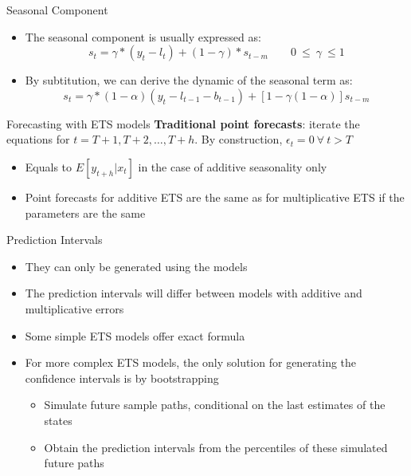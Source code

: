 \documentclass{beamer}
\begin{document}
\begin{frame}{Seasonal Component}
  \begin{itemize}
  \item The seasonal component is usually expressed as:
    \begin{equation*}
      s_t = \gamma*(y_t - l_t) + (1-\gamma)*s_{t-m} \qquad 0 \ \leq \ \gamma \ \leq 1
    \end{equation*}
  \item By subtitution, we can derive the dynamic of the seasonal term as:
    \begin{equation*}
      s_t = \gamma*(1-\alpha)(y_t - l_{t-1} - b_{t-1}) + [1 - \gamma(1-\alpha)] s_{t-m}
    \end{equation*}
  \end{itemize}  
\end{frame}




\begin{frame}{Forecasting with ETS models}
\textbf{Traditional point forecasts}: iterate the equations for $t = T+1, T+2, \dots, T+h$. By construction, $\epsilon_t = 0 \ \forall \ t>T$

\begin{itemize}
\item Equals to $E[y_{t+h}|x_t]$ in the case of additive seasonality only
\item Point forecasts for additive ETS are the same as for multiplicative ETS if the parameters are the same
\end{itemize}
  
\end{frame}



\begin{frame}{Prediction Intervals}

  \begin{itemize}
  \item They can only be generated using the models
  \item The prediction intervals will differ between models with additive and multiplicative errors
  \item Some simple ETS models offer exact formula
  \item For more complex ETS models, the only solution for generating the confidence intervals is by bootstrapping
    \begin{itemize}
    \item Simulate future sample paths, conditional on the last estimates of the states
    \item Obtain the prediction intervals from the percentiles of these simulated future paths
    \end{itemize}
  \end{itemize}
  
\end{frame}
\end{document}
